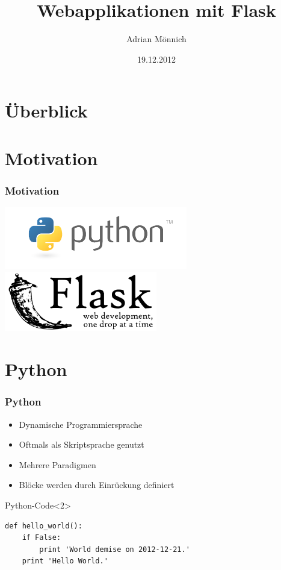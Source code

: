 \documentclass{beamer}
\date{19.12.2012}
\title{Webapplikationen mit Flask}
\author{Adrian Mönnich}
\institute[Hochschule Karlsruhe]{
  Fakultät für Informatik und Wirtschaftsinformatik\\
  Hochschule Karlsruhe
}
\begin{document}
\maketitle
\section*{Überblick}
\frame{\tableofcontents}


\section{Motivation}
\begin{frame}
  \frametitle{Motivation}
  \includegraphics[width=0.6\textwidth]{images/python-logo.png} \hspace*{\fill}
  \newline
  \hspace*{\fill} \includegraphics[width=0.5\textwidth]{images/flask-logo.pdf}
\end{frame}


\section{Python}
\begin{frame}[fragile]
  \frametitle{Python}
  \begin{itemize}
    \item Dynamische Programmiersprache
    \item Oftmals als Skriptsprache genutzt
    \item Mehrere Paradigmen
    \item Blöcke werden durch Einrückung definiert
  \end{itemize}

  \begin{exampleblock}{Python-Code}<2>
    \begin{lstlisting}
def hello_world():
    if False:
        print 'World demise on 2012-12-21.'
    print 'Hello World.'
    \end{lstlisting}
  \end{exampleblock}
\end{frame}
\end{document}

